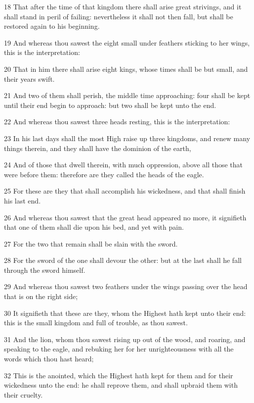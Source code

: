 \par 18 That after the time of that kingdom there shall arise great strivings, and it shall stand in peril of failing: nevertheless it shall not then fall, but shall be restored again to his beginning.
\par 19 And whereas thou sawest the eight small under feathers sticking to her wings, this is the interpretation:
\par 20 That in him there shall arise eight kings, whose times shall be but small, and their years swift.
\par 21 And two of them shall perish, the middle time approaching: four shall be kept until their end begin to approach: but two shall be kept unto the end.
\par 22 And whereas thou sawest three heads resting, this is the interpretation:
\par 23 In his last days shall the most High raise up three kingdoms, and renew many things therein, and they shall have the dominion of the earth,
\par 24 And of those that dwell therein, with much oppression, above all those that were before them: therefore are they called the heads of the eagle.
\par 25 For these are they that shall accomplish his wickedness, and that shall finish his last end.
\par 26 And whereas thou sawest that the great head appeared no more, it signifieth that one of them shall die upon his bed, and yet with pain.
\par 27 For the two that remain shall be slain with the sword.
\par 28 For the sword of the one shall devour the other: but at the last shall he fall through the sword himself.
\par 29 And whereas thou sawest two feathers under the wings passing over the head that is on the right side;
\par 30 It signifieth that these are they, whom the Highest hath kept unto their end: this is the small kingdom and full of trouble, as thou sawest.
\par 31 And the lion, whom thou sawest rising up out of the wood, and roaring, and speaking to the eagle, and rebuking her for her unrighteousness with all the words which thou hast heard;
\par 32 This is the anointed, which the Highest hath kept for them and for their wickedness unto the end: he shall reprove them, and shall upbraid them with their cruelty.
